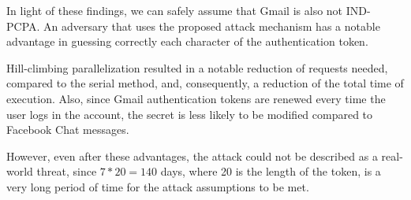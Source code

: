 In light of these findings, we can safely assume that Gmail is also not
IND-PCPA. An adversary that uses the proposed attack mechanism has a notable
advantage in guessing correctly each character of the authentication token.

Hill-climbing parallelization resulted in a notable reduction of requests
needed, compared to the serial method, and, consequently, a reduction of the
total time of execution. Also, since Gmail authentication tokens are renewed
every time the user logs in the account, the secret is less likely to be
modified compared to Facebook Chat messages.

However, even after these advantages, the attack could not be described as a
real-world threat, since \begin{math}7*20 = 140\end{math} days, where 20 is the length of
the token, is a very long period of time for the attack assumptions to be met.
